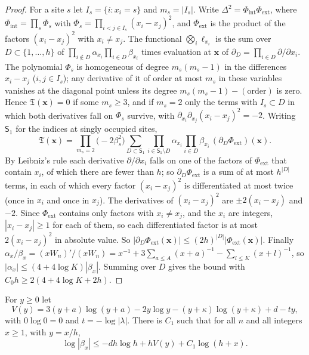 \begin{proof}
For a site $s$ let $I_s=\{i:x_i=s\}$ and $m_s=|I_s|$. Write $\Delta^2=\Phi_{\mathrm{int}}\Phi_{\mathrm{ext}}$, where $\Phi_{\mathrm{int}}=\prod_s\Phi_s$ with $\Phi_s=\prod_{i<j\in I_s}(x_i-x_j)^2$, and $\Phi_{\mathrm{ext}}$ is the product of the factors $(x_i-x_j)^2$ with $x_i\ne x_j$. The functional $\bigotimes_i\ell_{x_i}$ is the sum over $D\subset\{1,\dots,h\}$ of $\prod_{i\notin D}\alpha_{x_i}\prod_{i\in D}\beta_{x_i}$ times evaluation at $\mathbf x$ of $\partial_D=\prod_{i\in D}\partial/\partial x_i$. The polynomial $\Phi_s$ is homogeneous of degree $m_s(m_s-1)$ in the differences $x_i-x_j$ ($i,j\in I_s$); any derivative of it of order at most $m_s$ in these variables vanishes at the diagonal point unless its degree $m_s(m_s-1)-(\text{order})$ is zero. Hence $\mathfrak T(\mathbf x)=0$ if some $m_s\ge3$, and if $m_s=2$ only the terms with $I_s\subset D$ in which both derivatives fall on $\Phi_s$ survive, with $\partial_{x_i}\partial_{x_j}(x_i-x_j)^2=-2$. Writing $\mathsf S_1$ for the indices at singly occupied sites,
\[
\mathfrak T(\mathbf x)=\prod_{m_s=2}\bigl(-2\beta_s^2\bigr)\sum_{D\subset\mathsf S_1}\prod_{i\in\mathsf S_1\setminus D}\alpha_{x_i}\prod_{i\in D}\beta_{x_i}\,(\partial_D\Phi_{\mathrm{ext}})(\mathbf x).
\]
By Leibniz's rule each derivative $\partial/\partial x_i$ falls on one of the factors of $\Phi_{\mathrm{ext}}$ that contain $x_i$, of which there are fewer than $h$; so $\partial_D\Phi_{\mathrm{ext}}$ is a sum of at most $h^{|D|}$ terms, in each of which every factor $(x_i-x_j)^2$ is differentiated at most twice (once in $x_i$ and once in $x_j$). The derivatives of $(x_i-x_j)^2$ are $\pm2(x_i-x_j)$ and $-2$. Since $\Phi_{\mathrm{ext}}$ contains only factors with $x_i\ne x_j$, and the $x_i$ are integers, $|x_i-x_j|\ge1$ for each of them, so each differentiated factor is at most $2(x_i-x_j)^2$ in absolute value. So $|\partial_D\Phi_{\mathrm{ext}}(\mathbf x)|\le(2h)^{|D|}|\Phi_{\mathrm{ext}}(\mathbf x)|$. Finally $\alpha_x/\beta_x=(xW_n)'/(xW_n)=x^{-1}+3\sum_{a\le A}(x+a)^{-1}-\sum_{l\le K}(x+l)^{-1}$, so $|\alpha_x|\le(4+4\log K)|\beta_x|$. Summing over $D$ gives the bound with $C_0h\ge2(4+4\log K+2h)$.
\end{proof}

\begin{lemma}\label{lem:weight-positive}
For $y\ge0$ let
\[
V(y)=3(y+a)\log(y+a)-2y\log y-(y+\kappa)\log(y+\kappa)+d-ty ,
\]
with $0\log0=0$ and $t=-\log|\lambda|$. There is $C_1$ such that for all $n$ and all integers $x\ge1$, with $y=x/h$,
\[
\log|\beta_x|\le-dh\log h+hV(y)+C_1\log(h+x).
\]
\end{lemma}

